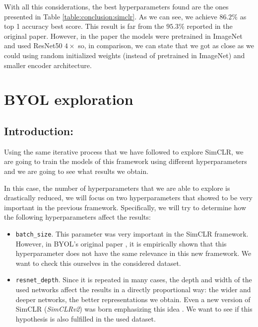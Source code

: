 With all this considerations, the best hyperparameters found are the ones presented in Table \ref{table:conclusion:simclr}. As we can see, we achieve $86.2\%$ as top 1 accuracy best score. This result is far from the $95.3\%$ reported in the original paper. However, in the paper the models were pretrained in ImageNet and used ResNet50 $4\times$ so, in comparison, we can state that we got as close as we could using random initialized weights (instead of pretrained in ImageNet) and smaller encoder architecture.

\section{BYOL exploration}


\subsection{Introduction:}

Using the same iterative process that we have followed to explore SimCLR, we are going to train the models of this framework using different hyperparameters and we are going to see what results we obtain.

In this case, the number of hyperparameters that we are able to explore is drastically reduced, we will focus on two hyperparameters that showed to be very important in the previous framework. Specifically, we will try to determine how the following hyperparameters affect the results:

\begin{itemize}
\item \lstinline{batch_size}. This parameter was very important in the SimCLR framework. However, in BYOL's original paper \citep{grill2020bootstrap}, it is empirically shown that this hyperparameter does not have the same relevance in this new framework. We want to check this ourselves in the considered dataset.
\item \lstinline{resnet_depth}. Since it is repeated in many cases, the depth and width of the used networks affect the results in a directly proportional way: the wider and deeper networks, the better representations we obtain. Even a new version of SimCLR (\emph{SimCLRv2}) was born emphasizing this idea \citep{chen2020big}. We want to see if this hypothesis is also fulfilled in the used dataset.
\end{itemize}


